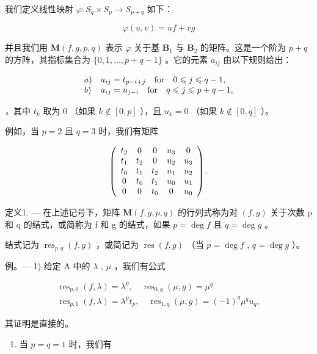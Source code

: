 我们定义线性映射 \(\varphi : S_q \times S_p \to S_{p + q}\) 如下：

\[
\varphi (u, v) = u f + v g
\]

并且我们用 \(\mathbf{M}(f,g,p,q)\) 表示 \(\varphi\) 关于基 \(\mathbf{B}_1\) 与 \(\mathbf{B}_2\) 的矩阵。这是一个阶为 \(p + q\) 的方阵，其指标集合为 \(\{0,1,\dots,p + q - 1\}\) 。它的元素 \(a_{ij}\) 由以下规则给出：

\[
\begin{array}{l l} a) & a _ {i j} = t _ {p - i + j} \quad \text {for} \quad 0 \leqslant j \leqslant q - 1, \\ b) & a _ {i j} = u _ {j - i} \quad \text {for} \quad q \leqslant j \leqslant p + q - 1, \end{array}
\]

，其中 \(t_k\) 取为 0 （如果 \(k \notin [0, p]\) ），且 \(u_k = 0\) （如果 \(k \notin [0, q]\) ）。

例如，当 \(p = 2\) 且 \(q = 3\) 时，我们有矩阵

\[
\left( \begin{array}{c c c c c} t _ {2} & 0 & 0 & u _ {3} & 0 \\ t _ {1} & t _ {2} & 0 & u _ {2} & u _ {3} \\ t _ {0} & t _ {1} & t _ {2} & u _ {1} & u _ {2} \\ 0 & t _ {0} & t _ {1} & u _ {0} & u _ {1} \\ 0 & 0 & t _ {0} & 0 & u _ {0} \end{array} \right).
\]

定义1. --- 在上述记号下，矩阵 \(\mathbf{M}(f,g,p,q)\) 的行列式称为对 \((f,g)\) 关于次数 p 和 q 的结式，或简称为 f 和 g 的结式，如果 \(p = \deg f\) 且 \(q = \deg g\) 。

结式记为 \(\operatorname{res}_{p,q}(f,g)\) ，或简记为 \(\operatorname{res}(f,g)\) （当 \(p=\deg f\) , \(q=\deg g\) ）。

例。--- 1) 给定 A 中的 \(\lambda\) , \(\mu\) ，我们有公式

\[
\begin{array}{l} \operatorname{res} _ {p, 0} (f, \lambda) = \lambda^ {p}, \quad \operatorname{res} _ {0, q} (\mu , g) = \mu^ {q} \\ \operatorname{res} _ {p, 1} (f, \lambda) = \lambda^ {p} t _ {p}, \quad \operatorname{res} _ {1, q} (\mu , g) = (- 1) ^ {q} \mu^ {q} u _ {q}, \end{array}
\]

其证明是直接的。

\begin{enumerate}
\def\labelenumi{\arabic{enumi})}
\setcounter{enumi}{1}
\tightlist
\item
  当 \(p = q = 1\) 时，我们有
\end{enumerate}

